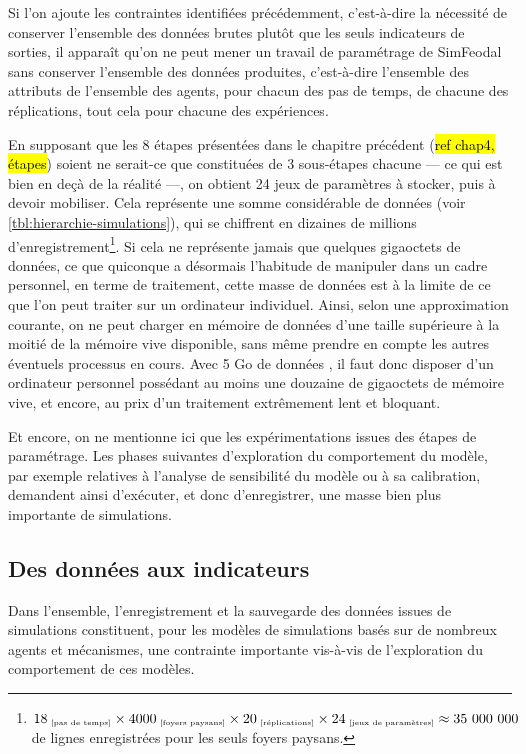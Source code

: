 	Si l'on ajoute les contraintes identifiées précédemment, c'est-à-dire la nécessité de conserver l'ensemble des données brutes plutôt que les seuls indicateurs de sorties, il apparaît qu'on ne peut mener un travail de paramétrage de SimFeodal sans conserver l'ensemble des données produites, c'est-à-dire l'ensemble des attributs de l'ensemble des agents, pour chacun des pas de temps, de chacune des réplications, tout cela pour chacune des expériences.

	En supposant que les 8 étapes présentées dans le chapitre précédent (\hl{ref chap4, étapes}) soient ne serait-ce que constituées de 3 sous-étapes chacune --- ce qui est bien en deçà de la réalité ---, on obtient 24 jeux de paramètres à stocker, puis à devoir mobiliser.
	Cela représente une somme considérable de données (voir \cref{tbl:hierarchie-simulations}), qui se chiffrent en dizaines de millions d'enregistrement\footnote{
	$18_{\text{\tiny ~[pas de temps]}} \times 4000_{\text{\tiny ~[foyers paysans]}} \times 20_{\text{\tiny ~[réplications]}} \times 24_{\text{\tiny ~[jeux de paramètres]}} \approx 35~000~000$ de lignes enregistrées pour les seuls foyers paysans.
	}.
	Si cela ne représente jamais que quelques gigaoctets de données, ce que quiconque a désormais l'habitude de manipuler dans un cadre personnel, en terme de traitement, cette masse de données est à la limite de ce que l'on peut traiter sur un ordinateur individuel.
	Ainsi, selon une approximation courante, on ne peut charger en mémoire de données d'une taille supérieure à la moitié de la mémoire vive disponible, sans même prendre en compte les autres éventuels processus en cours.
	Avec 5 Go de données , il faut donc disposer d'un ordinateur personnel possédant au moins une douzaine de gigaoctets de mémoire vive, et encore, au prix d'un traitement extrêmement lent et bloquant.

	Et encore, on ne mentionne ici que les expérimentations issues des étapes de paramétrage.
	Les phases suivantes d'exploration du comportement du modèle, par exemple relatives à l'analyse de sensibilité du modèle ou à sa calibration, demandent ainsi d'exécuter, et donc d'enregistrer, une masse bien plus importante de simulations.

	\subsection{Des données aux indicateurs}\label{subsec:donnees-indicateurs}
	
	Dans l'ensemble, l'enregistrement et la sauvegarde des données issues de simulations constituent, pour les modèles de simulations basés sur de nombreux agents et mécanismes, une contrainte importante vis-à-vis de l'exploration du comportement de ces modèles.
	
